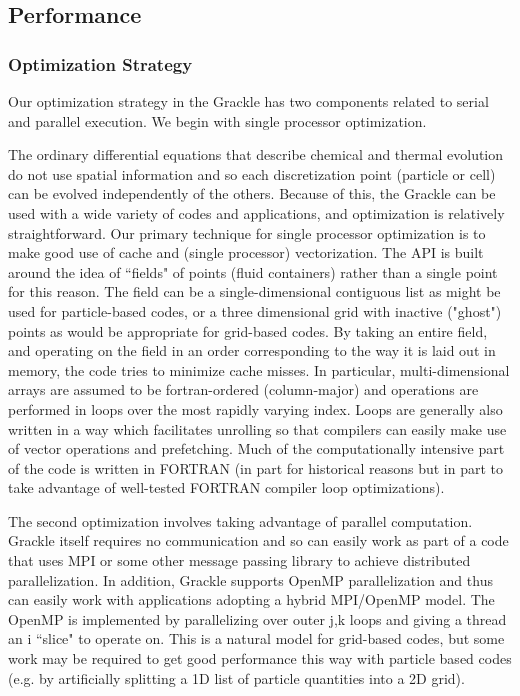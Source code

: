 \subsection{Performance}


\subsubsection{Optimization Strategy}

Our optimization strategy in the Grackle has two components related to serial and parallel execution.  We begin with single processor optimization.  

The ordinary differential equations that describe chemical and thermal evolution do not use spatial information and so each discretization point (particle or cell) can be evolved independently of the others.  Because of this, the Grackle can be used with a wide variety of codes and applications, and optimization is relatively straightforward.  Our primary technique for single processor optimization is to make good use of cache and (single processor) vectorization.  The API is built around the idea of ``fields" of points (fluid containers) rather than a single point for this reason.  The field can be a single-dimensional contiguous list as might be used for particle-based codes, or a three dimensional grid with inactive ("ghost") points as would be appropriate for grid-based codes.  By taking an entire field, and operating on the field in an order corresponding to the way it is laid out in memory, the code tries to minimize cache misses.  In particular, multi-dimensional arrays are assumed to be fortran-ordered (column-major) and operations are performed in loops over the most rapidly varying index.  Loops are generally also written in a way which facilitates unrolling so that compilers can easily make use of vector operations and prefetching.  Much of the computationally intensive part of the code is written in FORTRAN (in part for historical reasons but in part to take advantage of well-tested FORTRAN compiler loop optimizations).

The second optimization involves taking advantage of parallel computation.  Grackle itself requires no communication and so can easily work as part of a code that uses MPI or some other message passing library to achieve distributed parallelization.  In addition, Grackle supports OpenMP parallelization and thus can easily work with applications adopting a hybrid MPI/OpenMP model.  The OpenMP is implemented by parallelizing over outer j,k loops and giving a thread an i ``slice" to operate on.  This is a natural model for grid-based codes, but some work may be required to get good performance this way with particle based codes (e.g. by artificially splitting a 1D list of particle quantities into a 2D grid).

